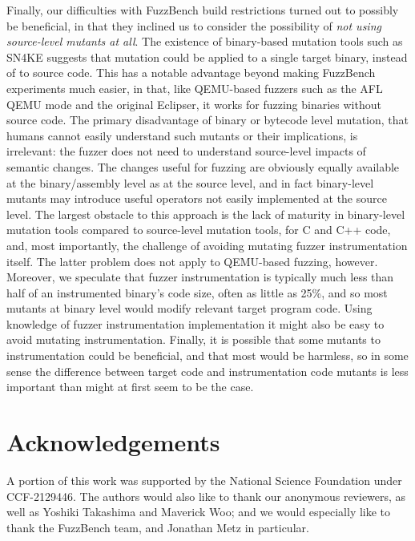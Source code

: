 Finally, our difficulties with FuzzBench build restrictions turned out to possibly be beneficial, in that they inclined us to consider the possibility of \emph{not using source-level mutants at all}.  The existence of binary-based mutation tools such as SN4KE \cite{SN4KE} suggests that mutation could be applied to a single target binary, instead of to source code.  This has a notable advantage beyond making FuzzBench experiments much easier, in that, like QEMU-based fuzzers such as the AFL QEMU mode and the original Eclipser, it works for fuzzing binaries without source code.    The primary disadvantage of binary or bytecode level mutation, that humans cannot easily understand such mutants or their implications, is irrelevant: the fuzzer does not need to understand source-level impacts of semantic changes.  The changes useful for fuzzing are obviously equally available at the binary/assembly level as at the source level, and in fact binary-level mutants may introduce useful operators not easily implemented at the source level.  The largest obstacle to this approach is the lack of maturity in binary-level mutation tools compared to source-level mutation tools, for C and C++ code, and, most importantly, the challenge of avoiding mutating fuzzer instrumentation itself.  The latter problem does not apply to QEMU-based fuzzing, however. Moreover, we speculate that fuzzer instrumentation is typically much less than half of an instrumented binary's code size, often as little as 25\%, and so most mutants at binary level would modify relevant target program code.  Using knowledge of fuzzer instrumentation implementation it might also be easy to avoid mutating instrumentation.  Finally, it is possible that some mutants to instrumentation could be beneficial, and that most would be harmless, so in some sense the difference between target code and instrumentation code mutants is less important than might at first seem to be the case.

\section*{Acknowledgements}
\begin{sloppypar}
  A portion of this work was  supported by the National Science Foundation under CCF-2129446.  The
authors would also like to thank our anonymous reviewers, as well as Yoshiki Takashima and Maverick Woo; and we would especially like to thank the FuzzBench team, and Jonathan Metz in particular.
\end{sloppypar}
